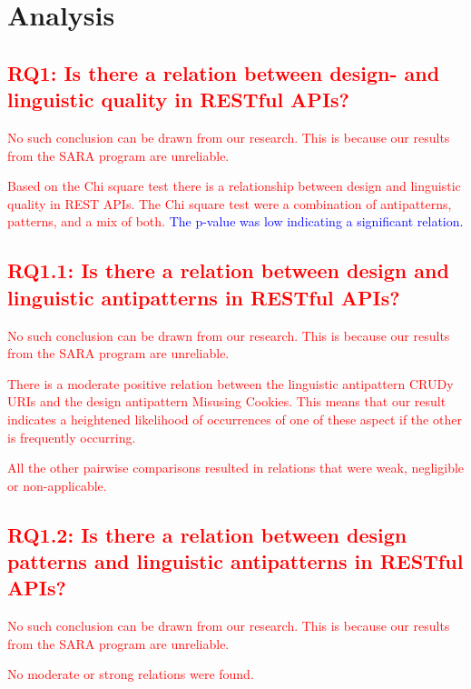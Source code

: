 \section{Analysis}

\subsection{\textcolor{red}{RQ1: Is there a relation between design- and linguistic quality in RESTful APIs?}}

\textcolor{red}{No such conclusion can be drawn from our research. This is because our results from the SARA program are unreliable.}

\textcolor{red}{Based on the Chi square test there is a relationship between design and linguistic quality in REST APIs. The Chi square test were a combination of antipatterns, patterns, and a mix of both.} \textcolor{blue}{The p-value was low indicating a significant relation.}

\subsection{\textcolor{red}{RQ1.1: Is there a relation between design and linguistic antipatterns in RESTful APIs?}}

\textcolor{red}{No such conclusion can be drawn from our research. This is because our results from the SARA program are unreliable.}

\textcolor{red}{
There is a moderate positive relation between the linguistic antipattern CRUDy URIs and the design antipattern Misusing Cookies. This means that our result indicates a heightened likelihood of occurrences of one of these aspect if the other is frequently occurring. 
}

\textcolor{red}{
All the other pairwise comparisons resulted in relations that were weak, negligible or non-applicable. 
}

\subsection{\textcolor{red}{RQ1.2: Is there a relation between design patterns and linguistic antipatterns in RESTful APIs?}}

\textcolor{red}{No such conclusion can be drawn from our research. This is because our results from the SARA program are unreliable.}

\textcolor{red}{No moderate or strong relations were found.}

